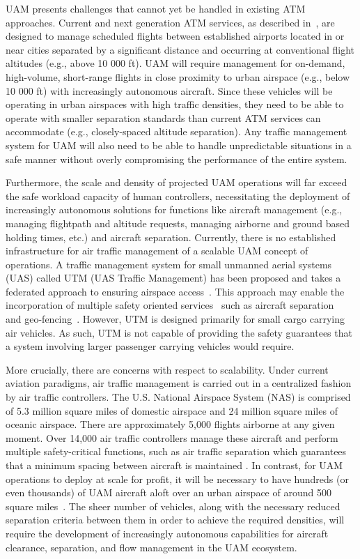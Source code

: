 UAM presents challenges that cannot yet be handled in existing ATM approaches. Current and next generation ATM services, as described in~\cite{cook2007european,swenson2006next}, are designed to manage scheduled flights between established airports located in or near cities separated by a significant distance and occurring at conventional flight altitudes (e.g., above 10 000 ft). UAM will require management for on-demand, high-volume, short-range flights in close proximity to urban airspace (e.g., below 10 000 ft) with increasingly autonomous aircraft. Since these vehicles will be operating in urban airspaces with high traffic densities, they need to be able to operate with smaller separation standards than current ATM services can accommodate (e.g., closely-spaced altitude separation). Any traffic management system for UAM will also need to be able to handle unpredictable situations in a safe manner without overly compromising the performance of the entire system. 

Furthermore, the scale and density of projected UAM operations will far exceed the safe workload capacity of human controllers, necessitating the deployment of increasingly autonomous solutions for functions like aircraft management (e.g., managing flightpath and altitude requests, managing airborne and ground based holding times, etc.) and aircraft separation. Currently, there is no established infrastructure for air traffic management of a scalable UAM concept of operations.  A traffic management system for small unmanned aerial systems (UAS) called UTM (UAS Traffic Management) has been proposed and takes a federated approach to ensuring airspace access~\cite{PRKRJJ2016}.  This approach may enable the incorporation of multiple safety oriented services~\cite{MBYDLGMC2018} such as aircraft separation~\cite{Daidalus} and geo-fencing~\cite{NCDDASC2018}.  However, UTM is designed primarily for small cargo carrying air vehicles. As such, UTM is not capable of providing the safety guarantees that a system involving larger passenger carrying vehicles would require. 

More crucially, there are concerns with respect to scalability. Under current aviation paradigms, air traffic management is carried out in a centralized fashion by air traffic controllers.  The U.S. National Airspace System (NAS) is comprised of 5.3 million square miles of domestic airspace and 24 million square miles of oceanic airspace.  There are approximately 5,000 flights airborne at any given moment.  Over 14,000 air traffic controllers manage these aircraft and perform multiple safety-critical functions, such as air traffic separation which guarantees that a minimum spacing between aircraft is maintained \cite{FAAData}.  In contrast, for UAM operations to deploy at scale for profit, it will be necessary to have hundreds (or even thousands) of UAM aircraft aloft over an urban airspace of around 500 square miles~\cite{goyal2018urban}.  The sheer number of vehicles, along with the necessary reduced separation criteria between them in order to achieve the required densities, will require the development of increasingly autonomous capabilities for aircraft clearance, separation, and flow management in the UAM ecosystem.  

